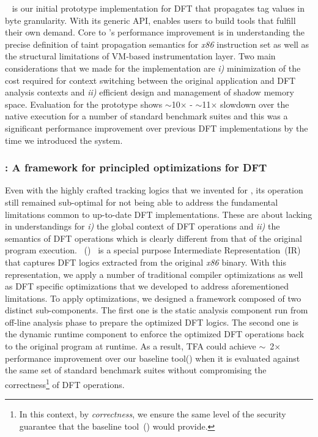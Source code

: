 \documentclass[letterpaper, 10pt]{article}
\begin{document}
\begin{small}
\libdft~\cite{libdft:2012vee} is our initial prototype implementation for DFT
that propagates tag values in byte granularity.
%
With its generic API, \libdft enables users to build tools that fulfill their
own demand. 
%
%
Core to \libdft's performance improvement is in understanding the precise
definition of taint propagation semantics for {\it x86} instruction set as well
as the structural limitations of VM-based instrumentation layer. 
%
%
Two main considerations that we made for the implementation are {\it i)}
minimization of the cost required for context switching between the original
application and DFT analysis contexts and {\it ii)} efficient design and
management of shadow memory space.
%
Evaluation for the prototype shows $\sim$10$\times$ - $\sim$11$\times$ slowdown
over the native execution for a number of standard benchmark suites and this
was a significant performance improvement over previous DFT implementations by
the time we introduced the system.

\subsubsection*{\TFA: A framework for principled optimizations for DFT}

Even with the highly crafted tracking logics that we invented for \libdft, its
operation still remained sub-optimal for not being able to address the
fundamental limitations common to up-to-date DFT implementations. 
%
These are about lacking in understandings for {\it i)} the global context of
DFT operations and {\it ii)} the semantics of DFT operations which is clearly
different from that of the original program execution.
%
\TFAFull~(\TFA)~\cite{tfa:2012ndss} is a special purpose Intermediate
Representation~(IR) that captures DFT logics extracted from the original {\it
x86} binary. With this representation, we apply a number of traditional
compiler optimizations as well as DFT specific optimizations that we developed
to address aforementioned limitations.
%
To apply optimizations, we designed a framework composed of two distinct
sub-components.  The first one is the static analysis component run from
off-line analysis phase to prepare the optimized DFT logics. The second one is
the dynamic runtime component to enforce the optimized DFT operations back to
the original program at runtime.
%
%
As a result, TFA could achieve \(\sim\)~2\(\times\) performance improvement
over  our baseline tool(\libdft) when it is evaluated against the same set of
standard benchmark suites without compromising the correctness\footnote{In
        this context, by {\it correctness}, we ensure the same level of the
security guarantee that the baseline tool~(\libdft) would provide.} of DFT
operations.


\end{small}
\end{document}
